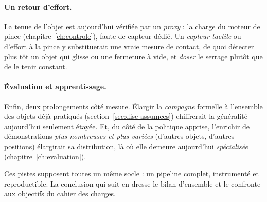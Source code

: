 \paragraph{Un retour d'effort.}
La tenue de l'objet est aujourd'hui vérifiée par un \emph{proxy} : la charge du moteur de pince (chapitre~\ref{ch:controle}), faute de capteur dédié. Un \emph{capteur tactile} ou d'effort à la pince y substituerait une vraie mesure de contact, de quoi détecter plus tôt un objet qui glisse ou une fermeture à vide, et \emph{doser} le serrage plutôt que de le tenir constant.

\paragraph{Évaluation et apprentissage.}
Enfin, deux prolongements côté mesure. Élargir la \emph{campagne} formelle à l'ensemble des objets déjà pratiqués (section~\ref{sec:disc-assumees}) chiffrerait la généralité aujourd'hui seulement étayée. Et, du côté de la politique apprise, l'enrichir de démonstrations \emph{plus nombreuses et plus variées} (d'autres objets, d'autres positions) élargirait sa distribution, là où elle demeure aujourd'hui \emph{spécialisée} (chapitre~\ref{ch:evaluation}).

\bigskip
\noindent Ces pistes supposent toutes un même socle : un pipeline complet, instrumenté et reproductible. La conclusion qui suit en dresse le bilan d'ensemble et le confronte aux objectifs du cahier des charges.
